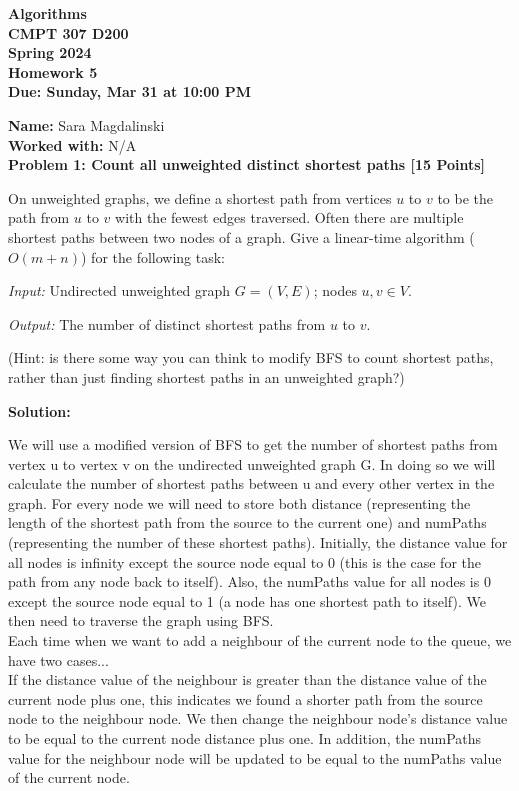 \documentclass[12pt]{article}
\newcommand{\Name}[1]{\noindent \textbf{Name:} #1 \\}
\newcommand{\Workedwith}[1]{\noindent \textbf{Worked with:} #1 \\}
\newcommand{\Problem}[3]{\mbox{} \newline \noindent \textbf{\textbf{Problem #1: #2 [#3 Points] \\ }}}
\begin{document}
\begin{center}
  \bf
  Algorithms \\
  CMPT 307 D200 \\
  Spring 2024 \\
  \rm
  Homework 5\\
  Due:  Sunday, Mar 31 at 10:00 PM \\
\end{center}

\Name{Sara Magdalinski}
\Workedwith{N/A}

\Problem{1}{Count all unweighted distinct shortest paths}{15}

On unweighted graphs, we define a shortest path from vertices $u$ to $v$ to be the path from $u$ to $v$ with the fewest edges traversed.
Often there are multiple shortest paths between two nodes of a graph. Give a linear-time algorithm ($O(m + n)$) for the following task:

\textit{Input:} Undirected unweighted graph $G = (V, E)$; nodes $u, v \in V$.

\textit{Output:} The number of distinct shortest paths from $u$ to $v$.

(Hint: is there some way you can think to modify BFS to count shortest paths, rather than just finding shortest paths in an unweighted graph?)

\textbf{Solution:}

We will use a modified version of BFS to get the number of shortest paths from vertex u to vertex v on the undirected unweighted graph G. In doing so we will calculate the number of shortest paths between u and every other vertex in the graph. For every node we will need to store both distance (representing the length of the shortest path from the source to the current one) and 
numPaths (representing the number of these shortest paths).
Initially, the distance value for all nodes is infinity except the source node equal to 0 (this is the case for the path from any node back to itself). Also, the numPaths value for all nodes is 0 except the source node equal to 1 (a node has one shortest path to itself). We then need to traverse the graph using BFS. \\

Each time when we want to add a neighbour of the current node to the queue, we have two cases...\\

If the distance value of the neighbour is greater than the distance value of the current node plus one, this indicates we found a shorter path from the source node to the neighbour node. We then change the neighbour node’s distance value to be equal to the current node distance plus one. In addition, the numPaths value for the neighbour node will be updated to be equal to the  numPaths value of the current node.\\
\end{document}
